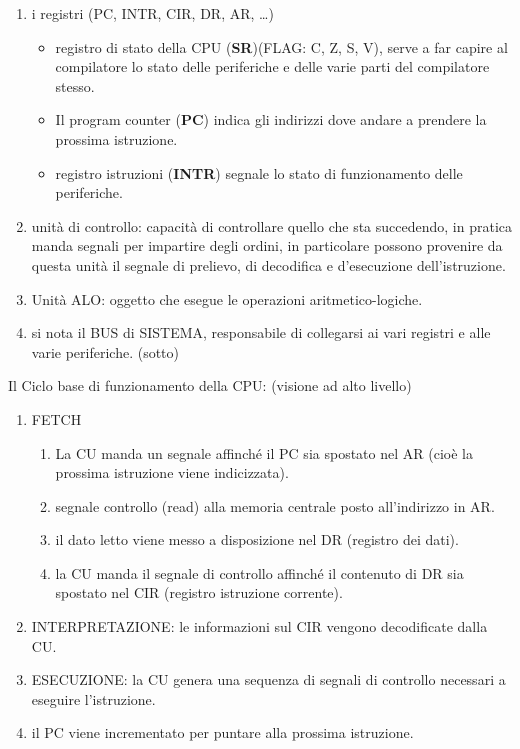 \documentclass[
  paper=a4,
  oneside  ,captions=tableheading
]{scrbook}
\providecommand{\tightlist}{%
  \setlength{\itemsep}{0pt}\setlength{\parskip}{0pt}}
\begin{document}
\begin{enumerate}
\def\labelenumi{\arabic{enumi}.}
\tightlist
\item
  i registri (PC, INTR, CIR, DR, AR, \ldots)

  \begin{itemize}
  \tightlist
  \item
    registro di stato della CPU (\textbf{SR})(FLAG: C, Z, S, V), serve a
    far capire al compilatore lo stato delle periferiche e delle varie
    parti del compilatore stesso.
  \item
    Il program counter (\textbf{PC}) indica gli indirizzi dove andare a
    prendere la prossima istruzione.
  \item
    registro istruzioni (\textbf{INTR}) segnale lo stato di
    funzionamento delle periferiche.
  \end{itemize}
\item
  unità di controllo: capacità di controllare quello che sta succedendo,
  in pratica manda segnali per impartire degli ordini, in particolare
  possono provenire da questa unità il segnale di prelievo, di
  decodifica e d'esecuzione dell'istruzione.
\item
  Unità ALO: oggetto che esegue le operazioni aritmetico-logiche.
\item
  si nota il BUS di SISTEMA, responsabile di collegarsi ai vari registri
  e alle varie periferiche. (sotto)
\end{enumerate}

Il Ciclo base di funzionamento della CPU: (visione ad alto livello)

\begin{enumerate}
\def\labelenumi{\arabic{enumi}.}
\tightlist
\item
  FETCH

  \begin{enumerate}
  \def\labelenumii{\arabic{enumii}.}
  \tightlist
  \item
    La CU manda un segnale affinché il PC sia spostato nel AR (cioè la
    prossima istruzione viene indicizzata).
  \item
    segnale controllo (read) alla memoria centrale posto all'indirizzo
    in AR.
  \item
    il dato letto viene messo a disposizione nel DR (registro dei dati).
  \item
    la CU manda il segnale di controllo affinché il contenuto di DR sia
    spostato nel CIR (registro istruzione corrente).
  \end{enumerate}
\item
  INTERPRETAZIONE: le informazioni sul CIR vengono decodificate dalla
  CU.
\item
  ESECUZIONE: la CU genera una sequenza di segnali di controllo
  necessari a eseguire l'istruzione.
\item
  il PC viene incrementato per puntare alla prossima istruzione.
\end{enumerate}
\end{document}
